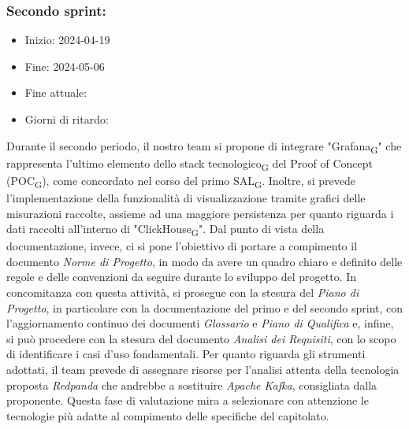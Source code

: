 \subsubsection{Secondo sprint:}
\begin{itemize}
    \item Inizio: 2024-04-19
    \item Fine: 2024-05-06
    \item Fine attuale:
    \item Giorni di ritardo:
\end{itemize}
Durante il secondo periodo, il nostro team si propone di integrare "{Grafana\textsubscript{G}}" che rappresenta l'ultimo elemento dello 
{stack tecnologico\textsubscript{G}} del Proof of Concept ({POC\textsubscript{G}}), come concordato nel corso del primo {SAL\textsubscript{G}}.
Inoltre, si prevede l'implementazione della funzionalità di visualizzazione tramite grafici delle misurazioni raccolte,
assieme ad una maggiore persistenza per quanto riguarda i dati raccolti all'interno di "{ClickHouse\textsubscript{G}}".
Dal punto di vista della documentazione, invece, ci si pone l'obiettivo di portare a compimento il documento \textit{Norme di Progetto},
in modo da avere un quadro chiaro e definito delle regole e delle convenzioni da seguire durante lo sviluppo del progetto.
In concomitanza con questa attività, si prosegue con la stesura del \textit{Piano di Progetto}, in particolare con la documentazione del primo
e del secondo sprint, con l'aggiornamento continuo dei documenti \textit{Glossario} e \textit{Piano di Qualifica} e, infine,
si può procedere con la stesura del documento \textit{Analisi dei Requisiti}, con lo scopo di identificare i casi d'uso fondamentali.
Per quanto riguarda gli strumenti adottati, il team prevede di assegnare risorse per l'analisi attenta della tecnologia proposta \textit{Redpanda}
che andrebbe a sostituire \textit{Apache Kafka}, consigliata dalla proponente. Questa fase di valutazione mira a selezionare con attenzione
le tecnologie più adatte al compimento delle specifiche del capitolato.

